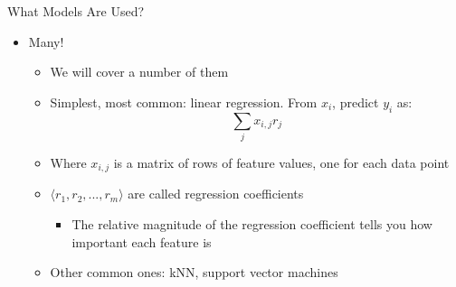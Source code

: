 \documentclass[aspectratio=169]{beamer}
\begin{document}
\begin{frame}{What Models Are Used?}

\begin{itemize}
\item Many!
	\begin{itemize}
	\item We will cover a number of them
	\item Simplest, most common: linear regression.  From $x_i$, predict $y_i$ as:
	$$ \sum_j x_{i,j} r_j$$
	\item Where $x_{i,j}$ is a matrix of rows of feature values, one for each data point
	\item $\langle r_1, r_2, ..., r_m \rangle$ are called regression coefficients
		\begin{itemize}
		\item The relative magnitude of the regression coefficient tells you how important each feature is
		\end{itemize}
	\item Other common ones: kNN, support vector machines
	\end{itemize}
\end{itemize}
\end{frame}
\end{document}
